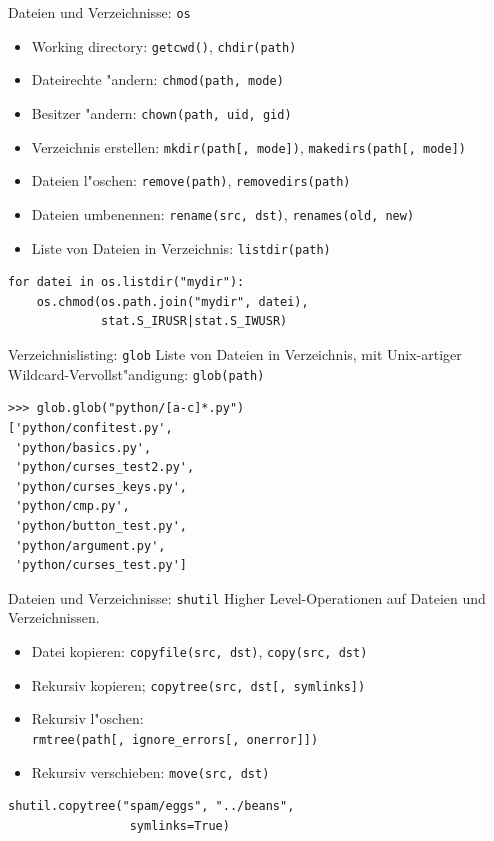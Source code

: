 \begin{frame}[fragile]{Dateien und Verzeichnisse: \texttt{os}}
\begin{itemize}
\item Working directory: \lstinline{getcwd()}, \lstinline{chdir(path)}
\item Dateirechte "andern: \lstinline{chmod(path, mode)}
\item Besitzer "andern: \lstinline{chown(path, uid, gid)}
\item Verzeichnis erstellen: \lstinline{mkdir(path[, mode])}, \lstinline{makedirs(path[, mode])}
\item Dateien l"oschen: \lstinline{remove(path)}, \lstinline{removedirs(path)}
\item Dateien umbenennen: \lstinline{rename(src, dst)}, \lstinline{renames(old, new)}
\item Liste von Dateien in Verzeichnis: \lstinline{listdir(path)}
\end{itemize}
\begin{lstlisting}[style=Python]
for datei in os.listdir("mydir"):
    os.chmod(os.path.join("mydir", datei), 
             stat.S_IRUSR|stat.S_IWUSR)
\end{lstlisting}
\end{frame} 

\begin{frame}[fragile]{Verzeichnislisting: \texttt{glob}}
Liste von Dateien in Verzeichnis, mit Unix-artiger Wildcard-Vervollst"andigung: \texttt{glob(path)}
\begin{lstlisting}[style=Shell]
>>> glob.glob("python/[a-c]*.py")
['python/confitest.py',
 'python/basics.py',
 'python/curses_test2.py',
 'python/curses_keys.py',
 'python/cmp.py',
 'python/button_test.py',
 'python/argument.py',
 'python/curses_test.py']
\end{lstlisting}
\end{frame}

\begin{frame}[fragile]{Dateien und Verzeichnisse: \texttt{shutil}}
Higher Level-Operationen auf Dateien und Verzeichnissen.
\begin{itemize}
\item Datei kopieren: \texttt{copyfile(src, dst)}, \texttt{copy(src, dst)}
\item Rekursiv kopieren; \texttt{copytree(src, dst[, symlinks])}
\item Rekursiv l"oschen: \\\texttt{rmtree(path[, ignore\_errors[, onerror]])}
\item Rekursiv verschieben: \texttt{move(src, dst)}
\end{itemize}
\begin{lstlisting}[style=Python]
shutil.copytree("spam/eggs", "../beans", 
                 symlinks=True)
\end{lstlisting}
\end{frame}

